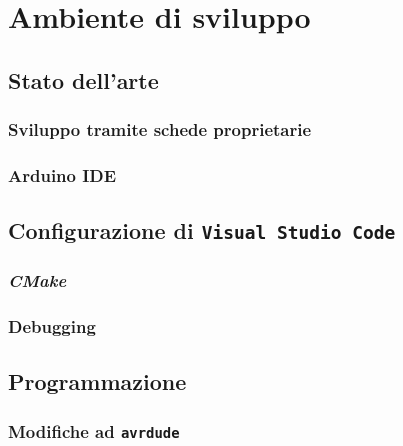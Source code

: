 \chapter{Ambiente di sviluppo}
    \section{Stato dell'arte}
        \subsection{Sviluppo tramite schede proprietarie}
        \subsection{Arduino IDE}
    \section{Configurazione di \texttt{Visual Studio Code}}
        \subsection{\textit{CMake}}
        \subsection{Debugging}
    \section{Programmazione}
        \subsection{Modifiche ad \texttt{avrdude}}
        